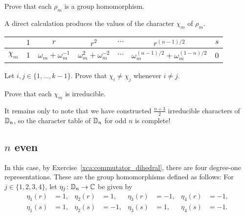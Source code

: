 \begin{exercise}
\label{xca:rho_m}
    Prove that each $\rho_m$ is a group homomorphism.
\end{exercise}

A direct calculation produces the values of the 
character $\chi_m$ of $\rho_m$.

\bigskip 
\begin{center}
    \begin{tabular}{|c|cccccc|}
         \hline 
         & $1$ & $r$ & $r^2$ & $\cdots$  & $r^{(n-1)/2}$ & $s$\\
         \hline 
         $\chi_m$ & $1$ & $\omega_m+\omega_m^{-1}$ & $\omega_m^2+\omega_m^{-2}$ & $\cdots$ & $\omega_m^{(n-1)/2}+\omega_m^{(1-n)/2}$ & 0\\
         \hline 
    \end{tabular}
\end{center}
\bigskip 

\begin{exercise}
\label{xca:all_different}
    Let $i,j\in\{1,\dots,k-1\}$. Prove that $\chi_i\ne\chi_j$ whenever $i\ne j$.
\end{exercise}

\begin{exercise}
\label{xca:irreducible}
    Prove that each $\chi_m$ is irreducible. 
\end{exercise}

It remains only to note that we have constructed 
$\frac{n+3}{2}$ irreducible characters of $\mathbb{D}_n$, 
so the character table of $\mathbb{D}_n$ for odd $n$ 
is complete!

\subsection{$n$ even}

In this case, by Exercise~\ref{xca:commutator_dihedral}, there are four 
degree-one representations. These are the group homomorphisms defined as follows: For $j\in\{1,2,3,4\}$, let $\eta_j\colon\mathbb{D}_n\to\mathbb{C}$ be given by 
\begin{align*}
    \eta_1(r)&=1, & \eta_2(r)&=1, &  \eta_3(r)&=-1, & \eta_4(r)&=-1,\\
    \eta_1(s)&=1, & \eta_2(s)&=-1, & \eta_3(s)&=1, &  \eta_4(s)&=-1.\\
\end{align*}


